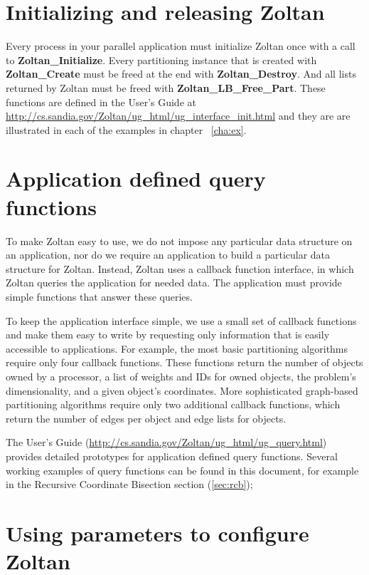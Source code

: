 \section{Initializing and releasing Zoltan}

Every process in your parallel application must initialize Zoltan once
with a call to \textbf{Zoltan\_Initialize}.  Every
partitioning instance that is created with \textbf{Zoltan\_Create} must be freed at
the end with \textbf{Zoltan\_Destroy}.  And all lists returned by
Zoltan must be freed with \textbf{Zoltan\_LB\_Free\_Part}.  These functions
are defined in the User's Guide at
\url{http://cs.sandia.gov/Zoltan/ug\_html/ug\_interface\_init.html}
and they are are illustrated in each of the examples in chapter ~\ref{cha:ex}.

\section{Application defined query functions}

To make Zoltan easy to use, we do not impose any particular data structure 
on an application, nor do we require an application to build a particular 
data structure for Zoltan. Instead, Zoltan uses a callback function interface, 
in which Zoltan queries the application for needed data. The application must 
provide simple functions that answer these queries.

To keep the application interface simple, we use a small set of callback functions 
and make them easy to write by requesting only information that is easily accessible 
to applications. For example, the most basic partitioning algorithms require only 
four callback functions. These functions return the number of objects owned by a 
processor, a list of weights and IDs for owned objects, the problem's dimensionality, 
and a given object's coordinates. More sophisticated graph-based partitioning 
algorithms require only two additional callback functions, which return the number 
of edges per object and edge lists for objects.

The User's Guide 
(\url{http://cs.sandia.gov/Zoltan/ug\_html/ug\_query.html})
provides detailed prototypes for application defined query functions.
Several working examples of query functions can be found in this document,
for example in the Recursive Coordinate Bisection section (\ref{sec:rcb});

\section{Using parameters to configure Zoltan}

